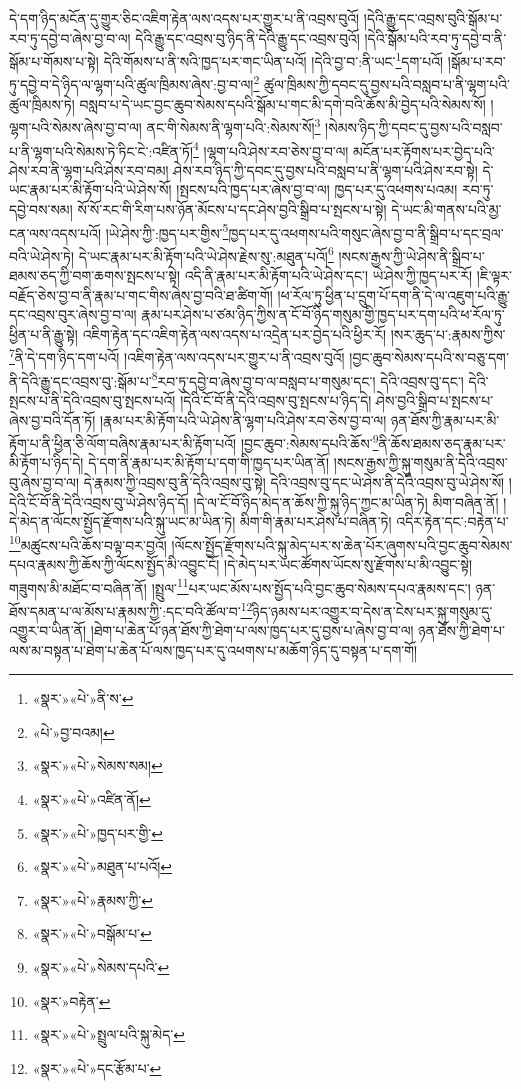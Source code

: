 དེ་དག་ཉིད་མངོན་དུ་གྱུར་ཅིང་འཇིག་རྟེན་ལས་འདས་པར་གྱུར་པ་ནི་འབྲས་བུའོ། །དེའི་རྒྱུ་དང་འབྲས་བུའི་སྒོམ་པ་རབ་ཏུ་དབྱེ་བ་ཞེས་བྱ་བ་ལ། དེའི་རྒྱུ་དང་འབྲས་བུ་ཉིད་ནི་དེའི་རྒྱུ་དང་འབྲས་བུའོ། །དེའི་སྒོམ་པའི་རབ་ཏུ་དབྱེ་བ་ནི་སྒོམ་པ་གོམས་པ་སྟེ། དེའི་གོམས་པ་ནི་སའི་ཁྱད་པར་གང་ཡིན་པའོ། །དེའི་བྱ་བ་:ནི་ཡང་\footnote{«སྣར་»«པེ་»ནི་ས་}དག་པའོ། །སྒོམ་པ་རབ་ཏུ་དབྱེ་བ་དེ་ཉིད་ལ་ལྷག་པའི་ཚུལ་ཁྲིམས་ཞེས་:བྱ་བ་ལ།\footnote{«པེ་»བྱ་བའམ།} ཚུལ་ཁྲིམས་ཀྱི་དབང་དུ་བྱས་པའི་བསླབ་པ་ནི་ལྷག་པའི་ཚུལ་ཁྲིམས་ཏེ། བསླབ་པ་དེ་ཡང་བྱང་ཆུབ་སེམས་དཔའི་སྒོམ་པ་གང་མི་དགེ་བའི་ཆོས་མི་བྱེད་པའི་སེམས་སོ། །ལྷག་པའི་སེམས་ཞེས་བྱ་བ་ལ། ནང་གི་སེམས་ནི་ལྷག་པའི་:སེམས་སོ།\footnote{«སྣར་»«པེ་»སེམས་སམ།} །སེམས་ཉིད་ཀྱི་དབང་དུ་བྱས་པའི་བསླབ་པ་ནི་ལྷག་པའི་སེམས་ཏེ་ཏིང་ངེ་:འཛིན་ཏོ།\footnote{«སྣར་»«པེ་»འཛིན་ནོ།} །ལྷག་པའི་ཤེས་རབ་ཅེས་བྱ་བ་ལ། མངོན་པར་རྟོགས་པར་བྱེད་པའི་ཤེས་རབ་ནི་ལྷག་པའི་ཤེས་རབ་བམ། ཤེས་རབ་ཉིད་ཀྱི་དབང་དུ་བྱས་པའི་བསླབ་པ་ནི་ལྷག་པའི་ཤེས་རབ་སྟེ། དེ་ཡང་རྣམ་པར་མི་རྟོག་པའི་ཡེ་ཤེས་སོ། །སྤངས་པའི་ཁྱད་པར་ཞེས་བྱ་བ་ལ། ཁྱད་པར་དུ་འཕགས་པའམ། རབ་ཏུ་དབྱེ་བས་སམ། སོ་སོ་རང་གི་རིག་པས་ཉོན་མོངས་པ་དང་ཤེས་བྱའི་སྒྲིབ་པ་སྤངས་པ་སྟེ། དེ་ཡང་མི་གནས་པའི་མྱ་ངན་ལས་འདས་པའོ། །ཡེ་ཤེས་ཀྱི་:ཁྱད་པར་གྱིས་\footnote{«སྣར་»«པེ་»ཁྱད་པར་གྱི་}ཁྱད་པར་དུ་འཕགས་པའི་གསུང་ཞེས་བྱ་བ་ནི་སྒྲིབ་པ་དང་བྲལ་བའི་ཡེ་ཤེས་ཏེ། དེ་ཡང་རྣམ་པར་མི་རྟོག་པའི་ཡེ་ཤེས་རྗེས་སུ་:མཐུན་པའོ།\footnote{«སྣར་»«པེ་»མཐུན་པ་པའོ།} །སངས་རྒྱས་ཀྱི་ཡེ་ཤེས་ནི་སྒྲིབ་པ་ཐམས་ཅད་ཀྱི་བག་ཆགས་སྤངས་པ་སྟེ། འདི་ནི་རྣམ་པར་མི་རྟོག་པའི་ཡེ་ཤེས་དང་། ཡེ་ཤེས་ཀྱི་ཁྱད་པར་རོ། །ཇི་ལྟར་བརྗོད་ཅེས་བྱ་བ་ནི་རྣམ་པ་གང་གིས་ཞེས་བྱ་བའི་ཐ་ཚིག་གོ། །ཕ་རོལ་ཏུ་ཕྱིན་པ་དྲུག་པོ་དག་ནི་དེ་ལ་འཇུག་པའི་རྒྱུ་དང་འབྲས་བུར་ཞེས་བྱ་བ་ལ། རྣམ་པར་ཤེས་པ་ཙམ་ཉིད་ཀྱིས་ན་ངོ་བོ་ཉིད་གསུམ་གྱི་ཁྱད་པར་དག་པའི་ཕ་རོལ་ཏུ་ཕྱིན་པ་ནི་རྒྱུ་སྟེ། འཇིག་རྟེན་དང་འཇིག་རྟེན་ལས་འདས་པ་འདྲེན་པར་བྱེད་པའི་ཕྱིར་རོ། །སར་ཆུད་པ་:རྣམས་ཀྱིས་\footnote{«སྣར་»«པེ་»རྣམས་ཀྱི་}ནི་དེ་དག་ཉིད་དག་པའོ། །འཇིག་རྟེན་ལས་འདས་པར་གྱུར་པ་ནི་འབྲས་བུའོ། །བྱང་ཆུབ་སེམས་དཔའི་ས་བཅུ་དག་ནི་དེའི་རྒྱུ་དང་འབྲས་བུ་:སྒོམ་པ་\footnote{«སྣར་»«པེ་»བསྒོམ་པ་}རབ་ཏུ་དབྱེ་བ་ཞེས་བྱ་བ་ལ་བསླབ་པ་གསུམ་དང་། དེའི་འབྲས་བུ་དང་། དེའི་སྤངས་པ་ནི་དེའི་འབྲས་བུ་སྤངས་པའོ། །དེའི་ངོ་བོ་ནི་དེའི་འབྲས་བུ་སྤངས་པ་ཉིད་དེ། ཤེས་བྱའི་སྒྲིབ་པ་སྤངས་པ་ཞེས་བྱ་བའི་དོན་ཏོ། །རྣམ་པར་མི་རྟོག་པའི་ཡེ་ཤེས་ནི་ལྷག་པའི་ཤེས་རབ་ཅེས་བྱ་བ་ལ། ཉན་ཐོས་ཀྱི་རྣམ་པར་མི་རྟོག་པ་ནི་ཕྱིན་ཅི་ལོག་བཞིས་རྣམ་པར་མི་རྟོག་པའོ། །བྱང་ཆུབ་:སེམས་དཔའི་ཆོས་\footnote{«སྣར་»«པེ་»སེམས་དཔའི་}ནི་ཆོས་ཐམས་ཅད་རྣམ་པར་མི་རྟོག་པ་ཉིད་དེ། དེ་དག་ནི་རྣམ་པར་མི་རྟོག་པ་དག་གི་ཁྱད་པར་ཡིན་ནོ། །སངས་རྒྱས་ཀྱི་སྐུ་གསུམ་ནི་དེའི་འབྲས་བུ་ཞེས་བྱ་བ་ལ། དེ་རྣམས་ཀྱི་འབྲས་བུ་ནི་དེའི་འབྲས་བུ་སྟེ། དེའི་འབྲས་བུ་དང་ཡེ་ཤེས་ནི་དེའི་འབྲས་བུ་ཡེ་ཤེས་སོ། །དེའི་ངོ་བོ་ནི་དེའི་འབྲས་བུ་ཡེ་ཤེས་ཉིད་དོ། །དེ་ལ་ངོ་བོ་ཉིད་མེད་ན་ཆོས་ཀྱི་སྐུ་ཉིད་ཀྱང་མ་ཡིན་ཏེ། མིག་བཞིན་ནོ། །དེ་མེད་ན་ལོངས་སྤྱོད་རྫོགས་པའི་སྐུ་ཡང་མ་ཡིན་ཏེ། མིག་གི་རྣམ་པར་ཤེས་པ་བཞིན་ཏེ། འདིར་རྟེན་དང་:བརྟེན་པ་\footnote{«སྣར་»བརྟེན་}མཚུངས་པའི་ཆོས་བལྟ་བར་བྱའོ། །ལོངས་སྤྱོད་རྫོགས་པའི་སྐུ་མེད་པར་ས་ཆེན་པོར་ཞུགས་པའི་བྱང་ཆུབ་སེམས་དཔའ་རྣམས་ཀྱི་ཆོས་ཀྱི་ལོངས་སྤྱོད་མི་འབྱུང་ངོ། །དེ་མེད་པར་ཡང་ཚོགས་ཡོངས་སུ་རྫོགས་པ་མི་འབྱུང་སྟེ། གཟུགས་མི་མཐོང་བ་བཞིན་ནོ། །སྤྲུལ་\footnote{«སྣར་»«པེ་»སྤྲུལ་པའི་སྐུ་མེད་}པར་ཡང་མོས་པས་སྤྱོད་པའི་བྱང་ཆུབ་སེམས་དཔའ་རྣམས་དང་། ཉན་ཐོས་དམན་པ་ལ་མོས་པ་རྣམས་ཀྱི་:དང་བའི་ཚོལ་བ་\footnote{«སྣར་»«པེ་»དང་རྩོམ་པ་}ཉིད་ཉམས་པར་འགྱུར་བ་དེས་ན་ངེས་པར་སྐུ་གསུམ་དུ་འགྱུར་བ་ཡིན་ནོ། །ཐེག་པ་ཆེན་པོ་ཉན་ཐོས་ཀྱི་ཐེག་པ་ལས་ཁྱད་པར་དུ་བྱས་པ་ཞེས་བྱ་བ་ལ། ཉན་ཐོས་ཀྱི་ཐེག་པ་ལས་མ་བསྟན་པ་ཐེག་པ་ཆེན་པོ་ལས་ཁྱད་པར་དུ་འཕགས་པ་མཆོག་ཉིད་དུ་བསྟན་པ་དག་གོ། 